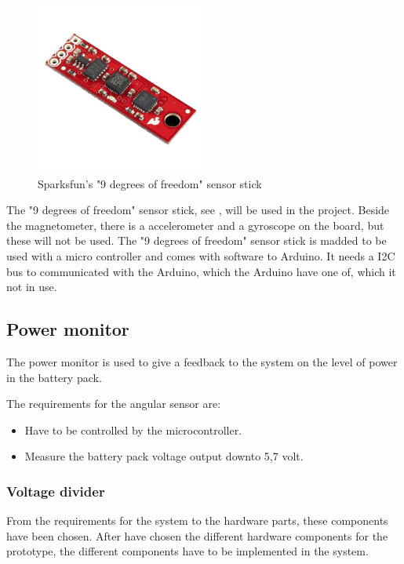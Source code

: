 \begin{figure}[H]
	\centering
	\includegraphics[width=0.50\textwidth]{figures/NineDegree}
		\caption{Sparksfun's "9 degrees of freedom" sensor stick} 
	\label{NineDegree}
\end{figure}

The "9 degrees of freedom" sensor stick, see , will be used in the project. Beside the magnetometer, there is a accelerometer and a gyroscope on the board, but these will not be used. The "9 degrees of freedom" sensor stick is madded to be used with a micro controller and comes with software to Arduino. It needs a I2C bus to communicated with the Arduino, which the Arduino have one of, which it not in use.


\subsection{Power monitor}
The power monitor is used to give a feedback to the system on the level of power in the battery pack.

The requirements for the angular sensor are:
\begin{itemize}
\item Have to be controlled by the microcontroller.
\item Measure the battery pack voltage output downto 5,7 volt.
\end{itemize}

\subsubsection{Voltage divider}


From the requirements for the system to the hardware parts, these components have been chosen. After have chosen the different hardware components for the prototype, the different components have to be implemented in the system.


